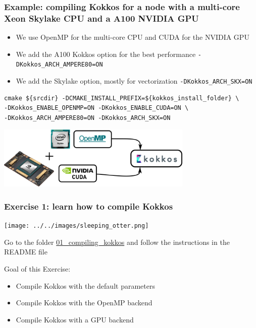 \documentclass[aspectratio=169]{beamer}
\begin{document}

\begin{frame}[fragile]
    \frametitle{Example: compiling Kokkos for a node with a multi-core Xeon Skylake CPU and a A100 NVIDIA GPU} 

\begin{itemize}
    \item We use OpenMP for the multi-core CPU and CUDA for the NVIDIA GPU
    \item We add the A100 Kokkos option for the best performance \texttt{-DKokkos\_ARCH\_AMPERE80=ON}
    \item We add the Skylake option, mostly for vectorization \texttt{-DKokkos\_ARCH\_SKX=ON}
\end{itemize}

\footnotesize
\begin{verbatim}
cmake ${srcdir} -DCMAKE_INSTALL_PREFIX=${kokkos_install_folder} \
-DKokkos_ENABLE_OPENMP=ON -DKokkos_ENABLE_CUDA=ON \
-DKokkos_ARCH_AMPERE80=ON -DKokkos_ARCH_SKX=ON
\end{verbatim}

\hspace{0.5cm}

\centering
\includegraphics[width=0.7\textwidth]{../../images/kokkos_a100_backend.png}

\end{frame}

\begin{frame}[fragile]
    \frametitle{Exercise 1: learn how to compile Kokkos}

    \begin{center}
    \texttt{[image: ../../images/sleeping\_otter.png]}
    \end{center}

    Go to the folder \href{https://github.com/CExA-project/cexa-kokkos-tutorials/tree/main/exercises/01_compiling_kokkos}{01\_compiling\_kokkos} and follow the instructions in the README file

    Goal of this Exercise:
    \begin{itemize}
        \item Compile Kokkos with the default parameters
        \item Compile Kokkos with the OpenMP backend
        \item Compile Kokkos with a GPU backend
    \end{itemize}

\end{frame}
\end{document}
